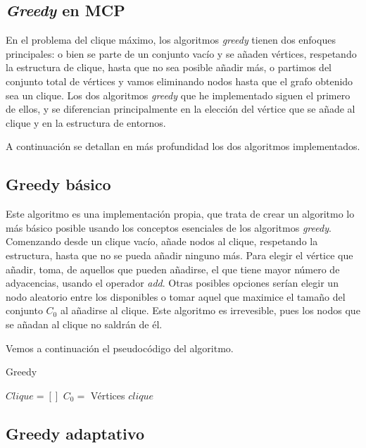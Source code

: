 \subsection{\textit{Greedy} en MCP}

En el problema del clique máximo, los algoritmos \textit{greedy} tienen dos enfoques principales:
o bien se parte de un conjunto vacío y se añaden vértices, respetando la estructura de clique,
hasta que no sea posible añadir más, o partimos del conjunto total de vértices y vamos eliminando
nodos hasta que el grafo obtenido sea un clique. Los dos algoritmos \textit{greedy} que he
implementado siguen el primero de ellos, y se diferencian principalmente en la elección del
vértice que se añade al clique y en la estructura de entornos.

A continuación se detallan en más profundidad los dos algoritmos implementados.

\subsection{Greedy básico}\label{greedy1}

Este algoritmo es una implementación propia, que trata de crear un algoritmo lo más
básico posible usando los conceptos esenciales de los algoritmos \textit{greedy}.
Comenzando desde un clique vacío, añade nodos al clique, respetando la estructura, hasta
que no se pueda añadir ninguno más. Para elegir el vértice que añadir, toma, de aquellos que
pueden añadirse, el que tiene mayor número de adyacencias, usando el operador \textit{add}.
Otras posibles opciones serían elegir un nodo aleatorio entre los disponibles o tomar aquel que
maximice el tamaño del conjunto $C_0$ al añadirse al clique. Este algoritmo es irrevesible,
pues los nodos que se añadan al clique no saldrán de él.

Vemos a continuación el pseudocódigo del algoritmo.

\begin{algorithm}[H]
\caption{Greedy}
  \begin{algorithmic}
  \State $Clique = [ ]$
  \State $C_0 = $ Vértices
  \Repeat
  \Return $clique$
  \EndFunction
  \end{algorithmic}
\end{algorithm}


\subsection{Greedy adaptativo}\label{greedy2}

